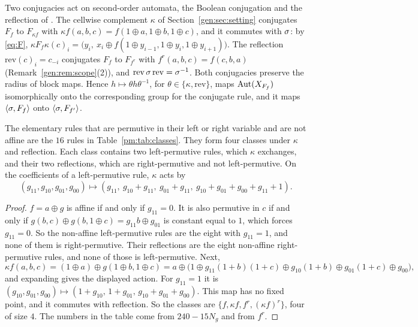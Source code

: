 Two conjugacies act on second-order automata, the Boolean conjugation and the reflection of \cite[Section~2]{Takesue1989}. The cellwise complement $\kappa$ of Section~\ref{gen:sec:setting} conjugates $F_f$ to $F_{\kappa f}$ with $\kappa f(a,b,c)=f(1\oplus a,1\oplus b,1\oplus c)$, and it commutes with $\sigma$: by \eqref{eq:F}, $\kappa F_f\kappa(c)_i=\bigl(y_i,\ x_i\oplus f(1\oplus y_{i-1},1\oplus y_i,1\oplus y_{i+1})\bigr)$. The reflection $\mathrm{rev}(c)_i=c_{-i}$ conjugates $F_f$ to $F_{f^r}$ with $f^r(a,b,c)=f(c,b,a)$ (Remark~\ref{gen:rem:scope}(2)), and $\mathrm{rev}\,\sigma\,\mathrm{rev}=\sigma^{-1}$. Both conjugacies preserve the radius of block maps. Hence $h\mapsto\theta h\theta^{-1}$, for $\theta\in\{\kappa,\mathrm{rev}\}$, maps $\operatorname{Aut}(X_{F_f})$ isomorphically onto the corresponding group for the conjugate rule, and it maps $\langle\sigma,F_f\rangle$ onto $\langle\sigma,F_{f'}\rangle$.

\begin{lemma}\label{pm:lem:classes}
The elementary rules that are permutive in their left or right variable and are not affine are the $16$ rules in Table~\ref{pm:tab:classes}. They form four classes under $\kappa$ and reflection. Each class contains two left-permutive rules, which $\kappa$ exchanges, and their two reflections, which are right-permutive and not left-permutive. On the coefficients of a left-permutive rule, $\kappa$ acts by
\[
(g_{11},g_{10},g_{01},g_{00})\longmapsto(g_{11},\ g_{10}+g_{11},\ g_{01}+g_{11},\ g_{10}+g_{01}+g_{00}+g_{11}+1).
\]
\end{lemma}

\begin{proof}
$f=a\oplus g$ is affine if and only if $g_{11}=0$. It is also permutive in $c$ if and only if $g(b,c)\oplus g(b,1\oplus c)=g_{11}b\oplus g_{01}$ is constant equal to $1$, which forces $g_{11}=0$. So the non-affine left-permutive rules are the eight with $g_{11}=1$, and none of them is right-permutive. Their reflections are the eight non-affine right-permutive rules, and none of those is left-permutive. Next,
\[
\kappa f(a,b,c)=(1\oplus a)\oplus g(1\oplus b,1\oplus c)=a\oplus\bigl(1\oplus g_{11}(1+b)(1+c)\oplus g_{10}(1+b)\oplus g_{01}(1+c)\oplus g_{00}\bigr),
\]
and expanding gives the displayed action. For $g_{11}=1$ it is $(g_{10},g_{01},g_{00})\mapsto(1+g_{10},\,1+g_{01},\,g_{10}+g_{01}+g_{00})$. This map has no fixed point, and it commutes with reflection. So the classes are $\{f,\kappa f,f^r,(\kappa f)^r\}$, four of size $4$. The numbers in the table come from $240-15N_g$ and from $f^r$.
\end{proof}

